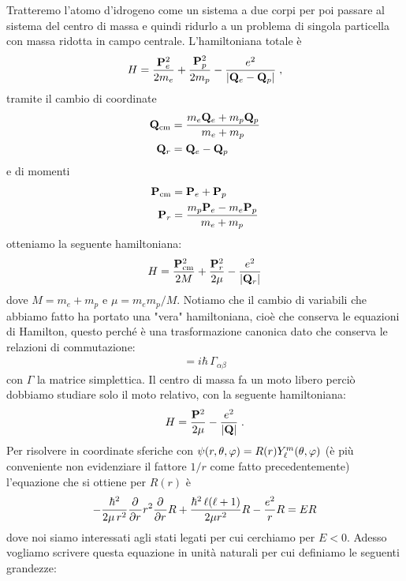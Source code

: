 Tratteremo l'atomo d'idrogeno come un sistema a due corpi per poi passare al sistema del centro di massa e quindi ridurlo a un problema di 
singola particella con massa ridotta in campo centrale. L'hamiltoniana totale è 
\begin{align*}
  H = \frac{\mathbf{P}_e^2}{2m_e} + \frac{\mathbf{P}_p^2}{2m_p} - \frac{e^2}{\left|{\mathbf{Q}_e - \mathbf{Q}_p}\right|}\;,
\end{align*}
tramite il cambio di coordinate 
\begin{align*}
  \mathbf{Q}_{\text{cm}} &= \frac{m_e \mathbf{Q}_e + m_p \mathbf{Q}_p}{m_e + m_p} 
  \\
  \mathbf{Q}_{r} &= \mathbf{Q}_e - \mathbf{Q}_p
\end{align*}
e di momenti
\begin{align*}
  \mathbf{P}_{\text{cm}} &= \mathbf{P}_e + \mathbf{P}_p
  \\
  \mathbf{P}_{r} &= \frac{m_p \mathbf{P}_e - m_e \mathbf{P}_p}{m_e + m_p} 
\end{align*}
otteniamo la seguente hamiltoniana:
\begin{align*}
  H = \frac{\mathbf{P}^2_{\text{cm}}}{2 M} + \frac{\mathbf{P}^2_r}{2 \mu} - \frac{e^2}{\left|{\mathbf{Q}_r}\right|}
\end{align*}
dove $ M = m_e + m_p $ e $ \mu = m_e m_p /M $. Notiamo che il cambio di variabili che abbiamo fatto ha portato una "vera" hamiltoniana, cioè che conserva 
le equazioni di Hamilton, questo perché è una trasformazione canonica dato che conserva le relazioni di commutazione:
\begin{align*}
  [ Z _\alpha, Z_\beta] = i\hbar\, \Gamma_{\alpha \beta} 
\end{align*}
con $ \Gamma $ la matrice simplettica. Il centro di massa fa un moto libero perciò dobbiamo studiare solo il moto relativo, con la seguente hamiltoniana:
\begin{align*}
  H = \frac{\mathbf{P}^2}{2\mu} - \frac{e^2}{\left|{\mathbf{Q}}\right|}\;.
\end{align*}
Per risolvere in coordinate sferiche con $ \psi(r,\theta, \varphi) = R(r) Y_\l^m (\theta,\varphi) $ (è più conveniente non evidenziare il fattore $ 1/r $ 
come fatto precedentemente) l'equazione che si ottiene per $ R(r) $ è
\begin{align*}
  -\frac{\hbar^2}{2\mu\, r^2} \frac{\partial^{} {}}{\partial {r}^{}} r^2 \frac{\partial^{} {}}{\partial {r}^{}} R + \frac{\hbar^2\,\ell (\ell+1)}{2\mu r^2} R - \frac{e^2}{r} R = E R 
\end{align*}
dove noi siamo interessati agli stati legati per cui cerchiamo per $ E < 0 $. 
Adesso vogliamo scrivere questa equazione in unità naturali per cui 
definiamo le seguenti grandezze:
